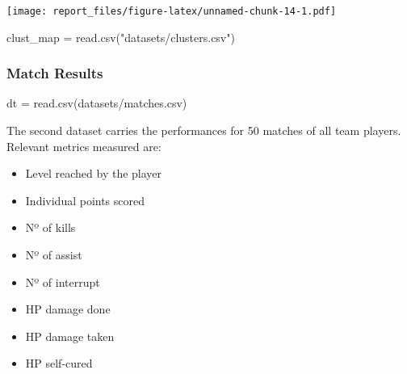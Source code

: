 \documentclass[
]{article}
\newenvironment{Shaded}{\begin{snugshade}}{\end{snugshade}}
\newcommand{\CommentTok}[1]{\textcolor[rgb]{0.56,0.35,0.01}{\textit{#1}}}
\newcommand{\FunctionTok}[1]{\textcolor[rgb]{0.00,0.00,0.00}{#1}}
\newcommand{\NormalTok}[1]{#1}
\newcommand{\OtherTok}[1]{\textcolor[rgb]{0.56,0.35,0.01}{#1}}
\newcommand{\StringTok}[1]{\textcolor[rgb]{0.31,0.60,0.02}{#1}}
\providecommand{\tightlist}{%
  \setlength{\itemsep}{0pt}\setlength{\parskip}{0pt}}
\begin{document}
\texttt{[image: report\_files/figure-latex/unnamed-chunk-14-1.pdf]}

\begin{Shaded}
\end{Shaded}

\begin{Shaded}
\begin{Highlighting}[]
\NormalTok{clust\_map }\OtherTok{=} \FunctionTok{read.csv}\NormalTok{(}\StringTok{"datasets/clusters.csv"}\NormalTok{)}
\end{Highlighting}
\end{Shaded}

\hypertarget{match-results}{%
\subsubsection{Match Results}\label{match-results}}

\begin{Shaded}
\begin{Highlighting}[]
\NormalTok{dt }\OtherTok{=} \FunctionTok{read.csv}\NormalTok{(}\StringTok{\textquotesingle{}datasets/matches.csv\textquotesingle{}}\NormalTok{)}
\end{Highlighting}
\end{Shaded}

The second dataset carries the performances for 50 matches of all team
players. Relevant metrics measured are:

\begin{itemize}
\tightlist
\item
  Level reached by the player
\item
  Individual points scored
\item
  Nº of kills
\item
  Nº of assist
\item
  Nº of interrupt
\item
  HP damage done
\item
  HP damage taken
\item
  HP self-cured
\end{itemize}
\end{document}
